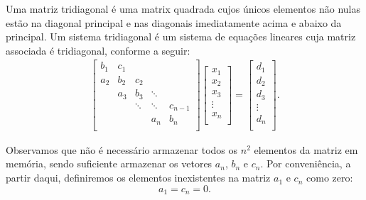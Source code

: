 Uma matriz tridiagonal é uma matrix quadrada cujos únicos elementos não nulas estão na diagonal principal e nas diagonais imediatamente acima e abaixo da principal. Um sistema tridiagonal é um sistema de equações lineares cuja matriz associada é tridiagonal, conforme a seguir:
\begin{eqnarray}\label{linsis:EqTriDiag} \begin{bmatrix}
   {b_1} & {c_1} & {   } & {   } & {   } \\
   {a_2} & {b_2} & {c_2} & {   } & {   } \\
   {   } & {a_3} & {b_3} & \ddots & {   } \\
   {   } & {   } & \ddots & \ddots & {c_{n-1}}\\
   {   } & {   } & {   } & {a_n} & {b_n}\\
\end{bmatrix}
\begin{bmatrix}
   {x_1 }  \\
   {x_2 }  \\
   {x_3 }  \\
   \vdots   \\
   {x_n }  \\
\end{bmatrix}
=
\begin{bmatrix}
   {d_1 }  \\
   {d_2 }  \\
   {d_3 }  \\
   \vdots   \\
   {d_n }  \\
\end{bmatrix}
.
\end{eqnarray}

Observamos que não é necessário armazenar todos os $n^2$ elementos da matriz em memória, sendo suficiente armazenar os vetores $a_n$, $b_n$ e $c_n$. Por conveniência, a partir daqui, definiremos os elementos inexistentes na matriz $a_1$ e $c_n$ como zero:
$$a_1=c_n=0.$$

